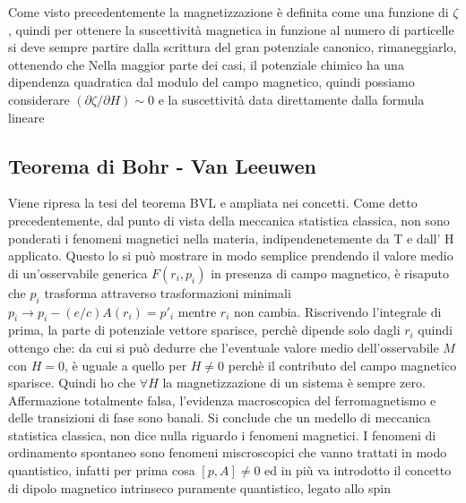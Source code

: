 \documentclass[a4paper,12pt]{article}
\begin{document}
Come visto precedentemente la magnetizzazione è definita come una funzione di $\zeta$, quindi per ottenere la suscettività magnetica in funzione al numero di particelle si deve sempre partire dalla scrittura del gran potenziale canonico, rimaneggiarlo, ottenendo che
Nella maggior parte dei casi, il potenziale chimico ha una dipendenza quadratica dal modulo del campo magnetico, quindi possiamo considerare $(\partial \zeta / \partial H) \sim 0$ e la suscettività data direttamente dalla formula lineare
\subsection{Teorema di Bohr - Van Leeuwen}
Viene ripresa la tesi del teorema BVL e ampliata nei concetti. Come detto precedentemente, dal punto di vista della meccanica statistica classica, non sono ponderati i fenomeni magnetici nella materia, indipendenetemente da T e dall' {\vet H} applicato. Questo lo si può mostrare in modo semplice prendendo il valore medio di un'osservabile generica $F(r_i,p_i)$
in presenza di campo magnetico, è risaputo che $p_i$  trasforma attraverso trasformazioni minimali $p_i \to p_i -(e/c)A(r_i) = p'_i$ mentre $r_i$ non cambia. Riscrivendo l'integrale di prima, la parte di potenziale vettore sparisce, perchè dipende solo dagli $r_i$ quindi ottengo che:
da cui si può dedurre che l'eventuale valore medio dell'osservabile $M$ con $H=0$, è uguale a quello per $H\neq0$ perchè il contributo del campo magnetico sparisce. Quindi ho che $\forall H$ 
la magnetizzazione di un sistema è sempre zero. Affermazione totalmente falsa, l'evidenza macroscopica del ferromagnetismo e delle transizioni di fase sono banali. Si conclude che un medello di meccanica statistica classica, non dice nulla riguardo i fenomeni magnetici. I fenomeni di ordinamento spontaneo sono fenomeni miscroscopici che vanno trattati in modo quantistico, infatti per prima cosa $\left[p,A\right]\neq 0$ ed in più va introdotto il concetto di dipolo magnetico intrinseco puramente quantistico, legato allo spin
\end{document}
